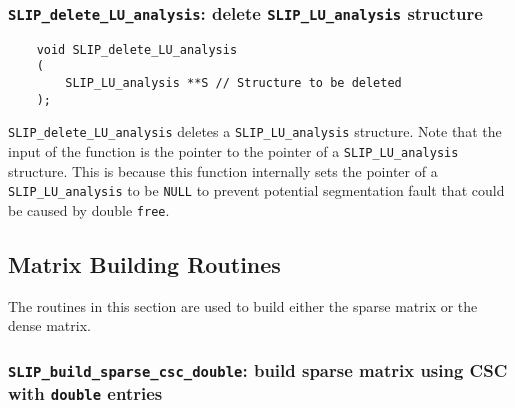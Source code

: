 \documentclass[12pt]{article}
\theoremstyle{definition}
\begin{document}

\cprotect\subsubsection{\verb|SLIP_delete_LU_analysis|: delete \verb|SLIP_LU_analysis| structure}
\label{ss:delete_LU_analysis}

\begin{mdframed}[userdefinedwidth=6in]
{\footnotesize
\begin{verbatim}
    void SLIP_delete_LU_analysis
    (
        SLIP_LU_analysis **S // Structure to be deleted
    );
\end{verbatim}
} \end{mdframed}


\verb|SLIP_delete_LU_analysis| deletes a \verb|SLIP_LU_analysis| structure.
Note that the input of the function is the pointer to the pointer of a
\verb|SLIP_LU_analysis| structure. This is because this function internally
sets the pointer of a \verb|SLIP_LU_analysis| to be \verb|NULL| to prevent
potential segmentation fault that could be caused by double \verb|free|.

\subsection{Matrix Building Routines} \label{s:Matrix_building_routines}

The routines in this section are used to build either the sparse matrix or the
dense matrix.


\cprotect\subsubsection{\verb|SLIP_build_sparse_csc_double|: build sparse matrix using CSC with \verb|double| entries}
\label{s:user:build_sparse_csc_double}
\end{document}

